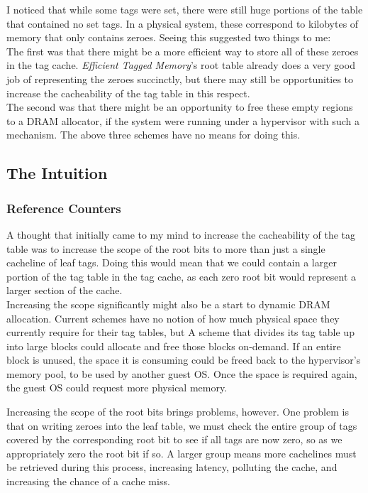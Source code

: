 I noticed that while some tags were set, there were still huge portions of the table that contained no set tags. In a physical system, these correspond to kilobytes of memory that only contains zeroes. Seeing this suggested two things to me:\\
The first was that there might be a more efficient way to store all of these zeroes in the tag cache. \textit{Efficient Tagged Memory}'s root table already does a very good job of representing the zeroes succinctly, but there may still be opportunities to increase the cacheability of the tag table in this respect.\\
The second was that there might be an opportunity to free these empty regions to a DRAM allocator, if the system were running under a hypervisor with such a mechanism. The above three schemes have no means for doing this.

\subsection{The Intuition}
\subsubsection{Reference Counters}
A thought that initially came to my mind to increase the cacheability of the tag table was to increase the scope of the root bits to more than just a single cacheline of leaf tags. Doing this would mean that we could contain a larger portion of the tag table in the tag cache, as each zero root bit would represent a larger section of the cache.\\
Increasing the scope significantly might also be a start to dynamic DRAM allocation. Current schemes have no notion of how much physical space they currently require for their tag tables, but A scheme that divides its tag table up into large blocks could allocate and free those blocks on-demand. If an entire block is unused, the space it is consuming could be freed back to the hypervisor's memory pool, to be used by another guest OS. Once the space is required again, the guest OS could request more physical memory.

Increasing the scope of the root bits brings problems, however. One problem is that on writing zeroes into the leaf table, we must check the entire group of tags covered by the corresponding root bit to see if all tags are now zero, so as we appropriately zero the root bit if so. A larger group means more cachelines must be retrieved during this process, increasing latency, polluting the cache, and increasing the chance of a cache miss.

